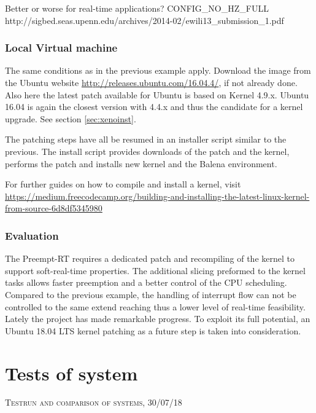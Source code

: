 \documentclass[]{scrartcl}
\begin{document}
Better or worse for real-time applications? CONFIG_NO_HZ_FULL
http://sigbed.seas.upenn.edu/archives/2014-02/ewili13_submission_1.pdf


\subsubsection{Local Virtual machine}

The same conditions as in the previous example apply. Download the image from the Ubuntu website \url{http://releases.ubuntu.com/16.04.4/}, if not already done. Also here the latest patch available for Ubuntu is based on Kernel 4.9.x. Ubuntu 16.04 is again the closest version with 4.4.x and thus the candidate for a kernel upgrade. See section \ref{sec:xenoinst}.

The patching steps have all be resumed in an installer script similar to the previous. The install script provides downloads of the patch and the kernel, performs the patch and installs new kernel and the Balena environment.


For further guides on how to compile and install a kernel, visit \url{ https://medium.freecodecamp.org/building-and-installing-the-latest-linux-kernel-from-source-6d8df5345980}

\subsubsection{Evaluation}

The Preempt-RT requires a dedicated patch and recompiling of the kernel to support soft-real-time properties. The additional slicing preformed to the kernel tasks allows faster preemption and a better control of the CPU scheduling. Compared to the previous example, the handling of interrupt flow can not be controlled to the same extend reaching thus a lower level of real-time feasibility. Lately the project has made remarkable progress. To exploit its full potential, an Ubuntu 18.04 LTS kernel patching as a future step is taken into consideration.

\section{Tests of system}

{\small\textsc{Testrun and comparison of systems, 30/07/18} \bigskip}
\end{document}
